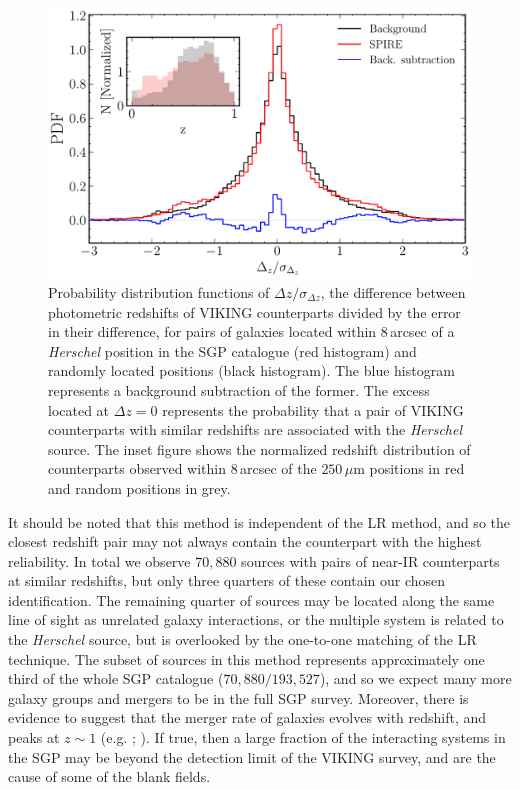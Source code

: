 \begin{figure}
    \centering
    \includegraphics[width=0.8\columnwidth]{Figures/delta_z_multiplicity.pdf}
    \caption[PDFs of $\Delta z/\sigma_{\Delta z}$ for \textit{Herschel} sources and random positions]{Probability distribution functions of $\Delta z/\sigma_{\Delta z}$, the difference between photometric redshifts of VIKING counterparts divided by the error in their difference, for pairs of galaxies located within $8\,$arcsec of a \textit{Herschel} position in the SGP catalogue (red histogram) and randomly located positions (black histogram). The blue histogram represents a background subtraction of the former. The excess located at $\Delta z = 0$ represents the probability that a pair of VIKING counterparts with similar redshifts are associated with the \textit{Herschel} source. The inset figure shows the normalized redshift distribution of counterparts observed within $8\,$arcsec of the $250\,\mu$m positions in red and random positions in grey.}
    \label{fig:delta_z_multiplicity}
\end{figure}

It should be noted that this method is independent of the LR method, and so the closest redshift pair may not always contain the counterpart with the highest reliability. In total we observe $70,880$ sources with pairs of near-IR counterparts at similar redshifts, but only three quarters of these contain our chosen identification. The remaining quarter of sources may be located along the same line of sight as unrelated galaxy interactions, or the multiple system is related to the \textit{Herschel} source, but is overlooked by the one-to-one matching of the LR technique. The subset of sources in this method represents approximately one third of the whole SGP catalogue ($70,880/193,527$), and so we expect many more galaxy groups and mergers to be in the full SGP survey. Moreover, there is evidence to suggest that the merger rate of galaxies evolves with redshift, and peaks at $z \sim 1$ (e.g. \citealt{Bell_2006}; \citealt{Ryan_2008}). If true, then a large fraction of the interacting systems in the SGP may be beyond the detection limit of the VIKING survey, and are the cause of some of the blank fields.

